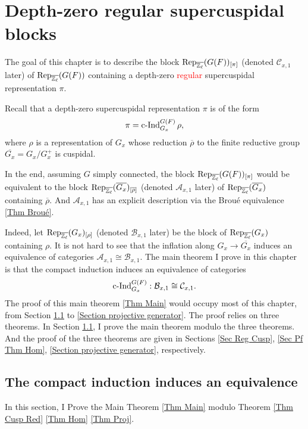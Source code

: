 
	\chapter{Depth-zero regular supercuspidal blocks} \label{Chapter Rep}
	
	The goal of this chapter is to describe the block $\operatorname{\operatorname{Rep}}_{\overline{\mathbb{Z}_{\ell}}}(G(F))_{[\pi]}$ (denoted $\mathcal{C}_{x,1}$ later) of $\operatorname{\operatorname{Rep}}_{\overline{\mathbb{Z}_{\ell}}}(G(F))$ containing a  depth-zero \textcolor{red}{regular} supercuspidal representation $\pi$.
	
	Recall that a depth-zero supercuspidal representation $\pi$ is of the form
	$$\pi=\operatorname{\operatorname{c-Ind}}_{G_x}^{G(F)}\rho,$$
	where $\rho$ is a representation of $G_x$ whose reduction $\overline{\rho}$ to the finite reductive group
	$\overline{G_x}=G_x/G_x^+$ is cuspidal.
	
	In the end, assuming $G$ simply connected, the block $\operatorname{\operatorname{Rep}}_{\overline{\mathbb{Z}_{\ell}}}(G(F))_{[\pi]}$ would be equivalent to the block $\operatorname{\operatorname{Rep}}_{\overline{\mathbb{Z}_{\ell}}}(\overline{G_x})_{[\overline{\rho}]}$ (denoted $\mathcal{A}_{x,1}$ later) of $\operatorname{\operatorname{Rep}}_{\overline{\mathbb{Z}_{\ell}}}(\overline{G_x})$ containing $\overline{\rho}$. And $\mathcal{A}_{x,1}$ has an explicit description via the Broué equivalence \ref{Thm Broué}.
	
	Indeed, let $\operatorname{\operatorname{Rep}}_{\overline{\mathbb{Z}_{\ell}}}(G_x)_{[\rho]}$ (denoted $\mathcal{B}_{x,1}$ later) be the block of $\operatorname{\operatorname{Rep}}_{\overline{\mathbb{Z}_{\ell}}}(G_x)$ containing $\rho$. It is not hard to see that the inflation along $G_x \to \overline{G_x}$ induces an equivalence of categories 
	$\mathcal{A}_{x,1} \cong \mathcal{B}_{x,1}$. The main theorem I prove in this chapter is that the compact induction induces an equivalence of categories
	$$\operatorname{\operatorname{c-Ind}}_{G_x}^{G(F)}: \mathcal{B}_{x,1} \cong \mathcal{C}_{x,1}.$$
	The proof of this main theorem \ref{Thm Main} would occupy most of this chapter, from Section \ref{Section cInd} to \ref{Section projective generator}. The proof relies on three theorems. In Section \ref{Section cInd}, I prove the main theorem modulo the three theorems. And the proof of the three theorems are given in Sections \ref{Sec Reg Cusp}, \ref{Sec Pf Thm Hom}, \ref{Section projective generator}, respectively.
	
	
	\section{The compact induction induces an equivalence}\label{Section cInd}
	In this section, I Prove the Main Theorem \ref{Thm Main} modulo Theorem \ref{Thm Cusp Red} \ref{Thm Hom} \ref{Thm Proj}.
	
